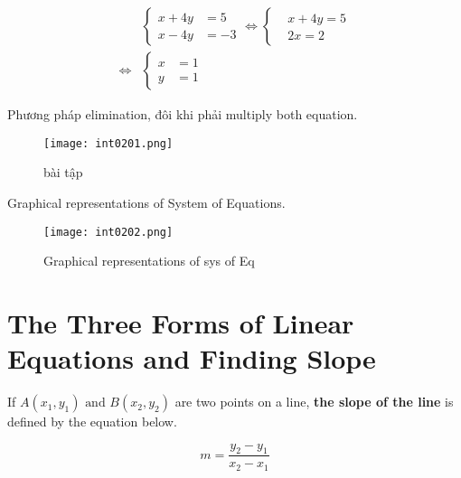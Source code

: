 \[
  \begin{aligned}
    &\left\{\begin{aligned} 
      x + 4y &= 5 \\ 
      x - 4y &= -3
    \end{aligned}\right. \iff 
    \left\{\begin{aligned}
      &x +4y = 5\\ 
      &2x = 2
    \end{aligned}\right.
    \\
    \iff &\left\{\begin{aligned} 
      x &= 1 \\ 
      y &= 1
    \end{aligned}\right.
  \end{aligned}
\]

\newpage

Phương pháp elimination, đôi khi phải multiply both equation.

\begin{figure}[htb!]
  \centering
  \texttt{[image: int0201.png]}
  \caption{bài tập}
\end{figure}

Graphical representations of System of Equations.

\begin{figure}[htb!]
  \centering
  \texttt{[image: int0202.png]}
  \caption{Graphical representations of sys of Eq}
\end{figure}

\newpage

\section{The Three Forms of Linear Equations and Finding Slope}




If \(A(x_{1},y_{1})\text{ and } B(x_{2},y_{2})\) are two points on a line, \textbf{the slope of the line} is defined by the equation below.

\begin{equation}
  m = \frac{y_{2}-y_{1}}{x_{2}-x_{1}}
  \label{eq:3.1}
\end{equation}

